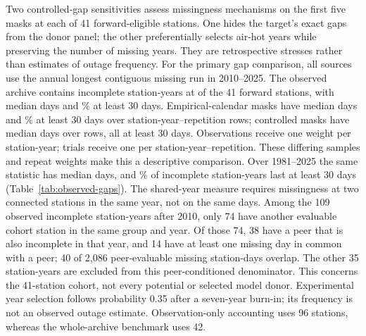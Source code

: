 \documentclass[draft,linenumbers]{agujournal2025}
\begin{document}
Two controlled-gap sensitivities assess missingness mechanisms on the first five masks at each of 41 forward-eligible stations. One hides the target's exact gaps from the donor panel; the other preferentially selects air-hot years while preserving the number of missing years. They are retrospective stresses rather than estimates of outage frequency. For the primary gap comparison, all sources use the annual longest contiguous missing run in 2010--2025. The observed archive contains \PGRObservedN{} incomplete station-years at \PGRObservedStations{} of the 41 forward stations, with median \PGRObservedMedian{} days and \PGRObservedLongThirty\% at least 30 days. Empirical-calendar masks have median \PGRCalendarMedian{} days and \PGRCalendarLongThirty\% at least 30 days over \PGRCalendarN{} station-year--repetition rows; controlled masks have median \PGRControlledMedian{} days over \PGRControlledN{} rows, all at least 30 days. Observations receive one weight per station-year; trials receive one per station-year--repetition. These differing samples and repeat weights make this a descriptive comparison. Over 1981--2025 the same statistic has median \PGRHistoricMedian{} days, and \PGRHistoricLongThirty\% of \PGRHistoricN{} incomplete station-years last at least 30 days (Table~\ref{tab:observed-gaps}). The shared-year measure requires missingness at two connected stations in the same year, not on the same days. Among the 109 observed incomplete station-years after 2010, only 74 have another evaluable cohort station in the same group and year. Of those 74, 38 have a peer that is also incomplete in that year, and 14 have at least one missing day in common with a peer; 40 of 2,086 peer-evaluable missing station-days overlap. The other 35 station-years are excluded from this peer-conditioned denominator. This concerns the 41-station cohort, not every potential or selected model donor. Experimental year selection follows probability 0.35 after a seven-year burn-in; its frequency is not an observed outage estimate. Observation-only accounting uses 96 stations, whereas the whole-archive benchmark uses 42.


\end{document}
